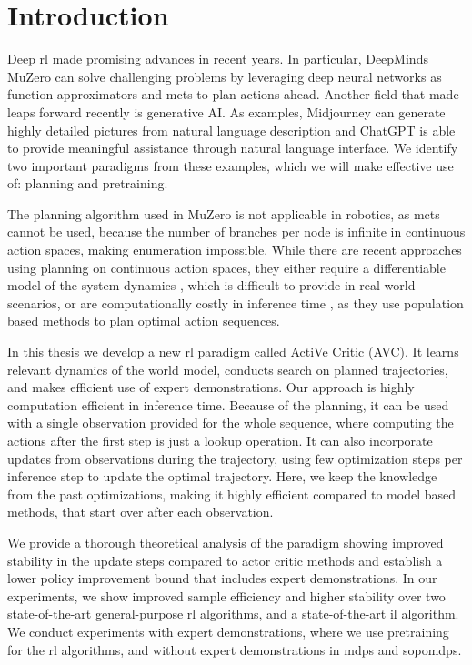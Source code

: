 \chapter{Introduction}
\label{chapter:Introduction}
Deep \ac{rl} made promising advances in recent years. In particular, DeepMinds MuZero \cite{MUZero} can solve challenging problems by leveraging deep neural networks as function 
approximators and \ac{mcts} to plan actions ahead. 
Another field that made leaps forward recently is generative AI. As examples, Midjourney \cite{midjourney} 
can generate highly detailed pictures from natural 
language description and ChatGPT \cite{cite:ChatGPT} is able to provide meaningful assistance through natural language interface. We identify two important paradigms from these 
examples, which we will make effective use of: planning and pretraining. 

The planning algorithm used in MuZero is not applicable in robotics, as \ac{mcts} cannot be used, because the number of branches per node is infinite in continuous action spaces, 
making enumeration impossible. While there are recent approaches 
using planning on continuous action spaces, they either require a differentiable model of the system dynamics \cite{Manna2022} \cite{Lee_Jeon_Kim_Kim_2020}, which is difficult to provide in real world scenarios,
or are computationally costly in inference time \cite{hafner2018planet}, as they use population based methods to plan optimal action sequences.

In this thesis we develop a new \ac{rl} 
paradigm called ActiVe Critic (AVC). It learns relevant dynamics of the world model, conducts search on planned trajectories, 
and makes efficient use of expert demonstrations. Our approach is highly computation efficient in inference time. Because of the planning, it can be used with a single observation provided 
for the whole sequence, where computing the actions after the first step is just a lookup operation. It can also incorporate updates from observations during 
the trajectory, using few optimization steps per inference step to update the 
optimal trajectory. Here, we keep the knowledge from the past optimizations, making it highly efficient compared to model based methods, that start over after 
each observation.

We provide a thorough theoretical analysis of the paradigm showing improved stability in the update steps compared to actor critic methods and 
establish a lower policy improvement bound that includes expert demonstrations. 
In our experiments, we show improved sample efficiency and higher stability over two state-of-the-art general-purpose \ac{rl} algorithms, and a state-of-the-art \ac{il} algorithm. 
We conduct experiments with expert demonstrations, where we use pretraining for the \ac{rl} algorithms, and without expert demonstrations in \ac{mdp}s and \ac{sopomdp}s.

